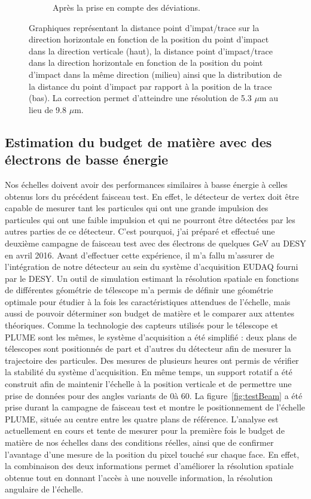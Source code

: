\documentclass[a4papper, 10pt]{article}
\begin{document}
\begin{figure}
\begin{subfigure}[t]{0.4\textwidth}
            \caption{Après la prise en compte des déviations.}
            \label{fig:correction}
        \end{subfigure}
        \caption{Graphiques représentant la distance point d'impat/trace sur la direction horizontale en fonction de la position du point d'impact dans la direction verticale (haut), la distance point d'impact/trace dans la direction horizontale en fonction de la position du point d'impact dans la même direction (milieu) ainsi que la distribution de la distance du point d'impact par rapport à la position de la trace (bas). La correction permet d'atteindre une résolution de 5.3 $\mu$m au lieu de 9.8 $\mu$m.}
        \label{fig:defCor}
    \end{figure}    

    \subsection{Estimation du budget de matière avec des électrons de basse énergie}

  Nos échelles doivent avoir des performances similaires à basse énergie à celles obtenus lors du précédent faisceau test.
  En effet, le détecteur de vertex doit être capable de mesurer tant les particules qui ont une grande impulsion des particules qui ont une faible impulsion et qui ne pourront être détectées par les autres parties de ce détecteur.
  C'est pourquoi, j'ai préparé et effectué une deuxième campagne de faisceau test avec des électrons de quelques GeV au DESY en avril 2016.
  Avant d'effectuer cette expérience, il m'a fallu m'assurer de l'intégration de notre détecteur au sein du système d'acquisition EUDAQ fourni par le DESY. 
  Un outil de simulation estimant la résolution spatiale en fonctions de différentes géométrie de télescope m'a permis de définir une géométrie optimale pour étudier à la fois les caractéristiques attendues de l'échelle, mais aussi de pouvoir déterminer son budget de matière et le comparer aux attentes théoriques.
  Comme la technologie des capteurs utilisés pour le télescope et PLUME sont les mêmes, le système d'acquisition a été simplifié : deux plans de télescopes sont positionnés de part et d'autres du détecteur afin de mesurer la trajectoire des particules. 
  Des mesures de plusieurs heures ont permis de vérifier la stabilité du système d'acquisition. 
  En même temps, un support rotatif a été construit afin de maintenir l'échelle à la position verticale et de permettre une prise de données pour des angles variants de 0\degre à 60\degre.
  La figure~\ref{fig:testBeam} a été prise durant la campagne de faisceau test et montre le positionnement de l'échelle PLUME, située au centre entre les quatre plans de référence.
  L'analyse est actuellement en cours et tente de mesurer pour la première fois le budget de matière de nos échelles dans des conditions réelles, ainsi que de confirmer l'avantage d'une mesure de la position du pixel touché sur chaque face.
  En effet, la combinaison des deux informations permet d'améliorer la résolution spatiale obtenue tout en donnant l'accès à une nouvelle information, la résolution angulaire de l'échelle.
\end{document}
